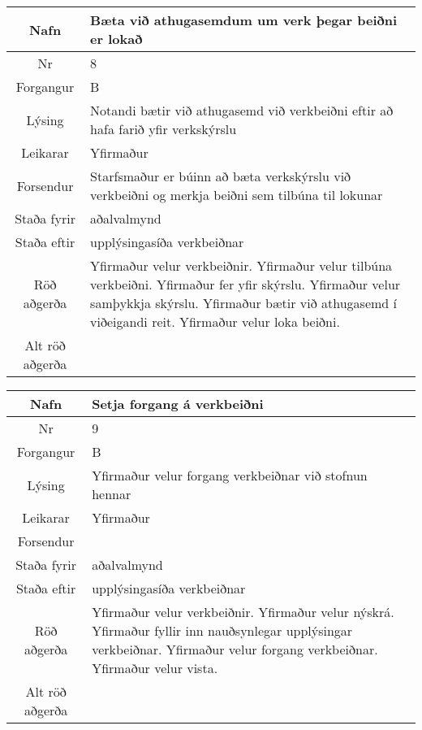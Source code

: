 \caption{Use case 7}\label{tab:use_case_7}
\begin{table}[h!]\centering
\begin{tabular}{|c|p{10cm}|}
\hline
Nafn&Bæta við athugasemdum um verk þegar beiðni er lokað\\
\hline
Nr&8\\
\hline
Forgangur&B\\
\hline
Lýsing&Notandi bætir við athugasemd við verkbeiðni eftir að hafa farið yfir verkskýrslu\\
\hline
Leikarar&Yfirmaður\\
\hline
Forsendur&Starfsmaður er búinn að bæta verkskýrslu við verkbeiðni og merkja beiðni sem tilbúna til lokunar\\
\hline
Staða fyrir&aðalvalmynd\\
\hline
Staða eftir&upplýsingasíða verkbeiðnar\\
\hline
Röð aðgerða&Yfirmaður velur verkbeiðnir. Yfirmaður velur tilbúna verkbeiðni. Yfirmaður fer yfir skýrslu. Yfirmaður velur samþykkja skýrslu. Yfirmaður bætir við athugasemd í viðeigandi reit. Yfirmaður velur loka beiðni.\\
\hline
Alt röð aðgerða&\\
\hline
\end{tabular}
\end{table}
\caption{Use case 8}\label{tab:use_case_8}
\begin{table}[h!]\centering
\begin{tabular}{|c|p{10cm}|}
\hline
Nafn&Setja forgang á verkbeiðni\\
\hline
Nr&9\\
\hline
Forgangur&B\\
\hline
Lýsing&Yfirmaður velur forgang verkbeiðnar við stofnun hennar\\
\hline
Leikarar&Yfirmaður\\
\hline
Forsendur&\\
\hline
Staða fyrir&aðalvalmynd\\
\hline
Staða eftir&upplýsingasíða verkbeiðnar\\
\hline
Röð aðgerða&Yfirmaður velur verkbeiðnir. Yfirmaður velur nýskrá. Yfirmaður fyllir inn nauðsynlegar upplýsingar verkbeiðnar. Yfirmaður velur forgang verkbeiðnar. Yfirmaður velur vista.\\
\hline
Alt röð aðgerða&\\
\hline
\end{tabular}
\end{table}
\caption{Use case 9}\label{tab:use_case_9}
